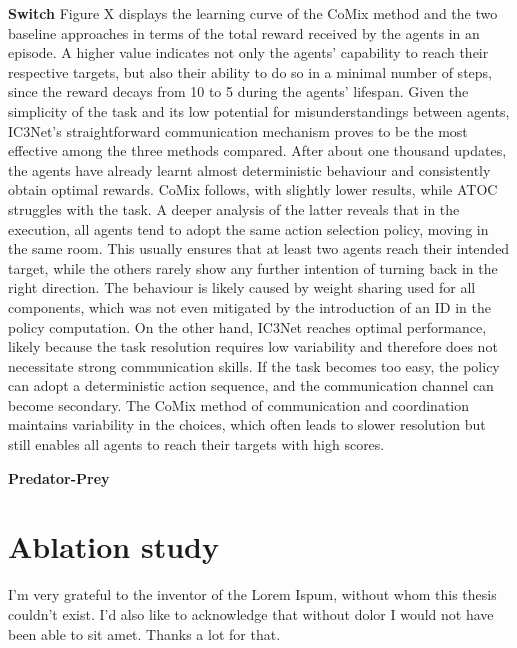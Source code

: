 \documentclass[a4paper,singleside,12pt]{report} %
\begin{document}
\textbf{Switch} Figure X displays the learning curve of the CoMix method and the two baseline approaches in terms of the total reward received by the agents in an episode. A higher value indicates not only the agents' capability to reach their respective targets, but also their ability to do so in a minimal number of steps, since the reward decays from 10 to 5 during the agents' lifespan.
Given the simplicity of the task and its low potential for misunderstandings between agents, IC3Net's straightforward communication mechanism proves to be the most effective among the three methods compared. After about one thousand updates, the agents have already learnt almost deterministic behaviour and consistently obtain optimal rewards. CoMix follows, with slightly lower results, while ATOC struggles with the task. A deeper analysis of the latter reveals that in the execution, all agents tend to adopt the same action selection policy, moving in the same room. This usually ensures that at least two agents reach their intended target, while the others rarely show any further intention of turning back in the right direction. The behaviour is likely caused by weight sharing used for all components, which was not even mitigated by the introduction of an ID in the policy computation. On the other hand, IC3Net reaches optimal performance, likely because the task resolution requires low variability and therefore does not necessitate strong communication skills. If the task becomes too easy, the policy can adopt a deterministic action sequence, and the communication channel can become secondary. The CoMix method of communication and coordination maintains variability in the choices, which often leads to slower resolution but still enables all agents to reach their targets with high scores.

\textbf{Predator-Prey} 





\section{Ablation study}\label{ablation}





	\appendix
	
	\printbibliography[heading=bibintoc] %
	
	\acknowledgements
	   I'm very grateful to the inventor of the Lorem Ispum, without whom this thesis couldn't exist. I'd also like to acknowledge that without dolor I would not have been able to sit amet. Thanks a lot for that.
		
\end{document}
